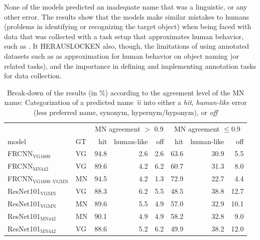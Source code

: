 None of the models predicted an inadequate name that was a linguistic, or any other error. 
The results show that the models make similar mistakes to humans (problems in identifying or recognizing the target object) when being faced with data that was collected with a task setup that approximates human behavior, such as \mn.  
It HERAUSLOCKEN also, though, the limitations of using annotated datasets such as \mn as approximation for human behavior on object naming )or related tasks), and the importance in defining and implementing annotation tasks for data collection. 


\begin{table}[t]
\centering
	\small
\begin{tabular}{ll|rrr|rrr}
\toprule
&  & \multicolumn{3}{c|}{MN agreement $>$ 0.9} & \multicolumn{3}{c}{MN agreement $\leq$0.9}\\
                         model &  GT &  hit &  human-like &  off &  hit &  human-like &  off \\
\midrule
       FRCNN$_{\text{VG1600}}$ &  VG &   94.8 &           2.6 &      2.6 &   63.6 &          30.9 &      5.5 \\
        FRCNN$_{\text{MN442}}$ &  VG &   89.6 &           4.2 &      6.2 &   60.7 &          31.3 &      8.0 \\
        \midrule
 FRCNN$_{\text{VG1600--VGMN}}$ &  MN &   94.5 &           4.2 &      1.3 &   72.9 &          22.7 &      4.4 \\
 \midrule
     ResNet101$_{\text{VGMN}}$ &  VG &   88.3 &           6.2 &      5.5 &   48.5 &          38.8 &     12.7 \\
     ResNet101$_{\text{VGMN}}$ &  MN &   89.6 &           5.5 &      4.9 &   57.0 &          32.9 &     10.1 \\
    ResNet101$_{\text{MN442}}$ &  MN &   90.1 &           4.9 &      4.9 &   58.2 &          32.8 &      9.0 \\
    ResNet101$_{\text{MN442}}$ &  VG &   88.6 &           5.2 &      6.2 &   49.9 &          38.2 &     12.0 \\
\bottomrule
\end{tabular}
\caption{Break-down of the results (in \%) according to the agreement level of the MN name: Categorization of a predicted name\ $\hat{n}$ into either a \textit{hit}, \textit{human-like} error (less preferred name, synonym, hypernym/hyponym), or \textit{off} \label{tab:exp_errors_agreement}}
\end{table}

